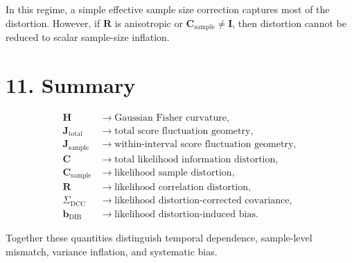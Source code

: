 \documentclass[11pt]{article}
\begin{document}
In this regime, a simple effective sample size correction captures most of the distortion.
However, if $\mathbf R$ is anisotropic or $\mathbf C_{\mathrm{sample}} \neq \mathbf I$, then distortion cannot be reduced to scalar sample-size inflation.

\section*{11. Summary}

\begin{align}
\mathbf H &\rightarrow \text{Gaussian Fisher curvature}, \\
\mathbf J_{\mathrm{total}} &\rightarrow \text{total score fluctuation geometry}, \\
\mathbf J_{\mathrm{sample}} &\rightarrow \text{within-interval score fluctuation geometry}, \\
\mathbf C &\rightarrow \text{total likelihood information distortion}, \\
\mathbf C_{\mathrm{sample}} &\rightarrow \text{likelihood sample distortion}, \\
\mathbf R &\rightarrow \text{likelihood correlation distortion}, \\
\Sigma_{\mathrm{DCC}} &\rightarrow \text{likelihood distortion-corrected covariance}, \\
\mathbf b_{\mathrm{DIB}} &\rightarrow \text{likelihood distortion-induced bias}.
\end{align}

Together these quantities distinguish temporal dependence, sample-level mismatch, variance inflation, and systematic bias.
\end{document}
